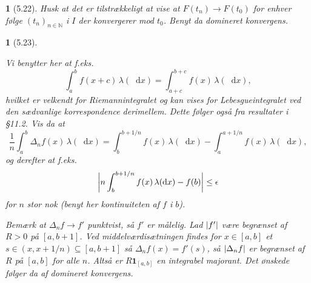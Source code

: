 \documentclass[a4paper, 11pt, article, danish, oneside]{memoir}
\title{\doctitle}
\author{\docauthor}
\newcommand{\naturals}{\mathbb{N}}
\newcommand{\blank}{\mathrel{\;\cdot\;}}
\newcommand{\blankifempty}[1]{\ifstrempty{#1}{\blank}{#1}}
\DeclarePairedDelimiter{\auxdelimlvert}{\lvert}{\rvert}
\newcommand{\abs}[2][]{\auxdelimlvert[#1]{\blankifempty{#2}}}
\newcommand{\dif}{\mathop{}\!\mathrm{d}}
\newcommand{\indicator}[1]{\mathbf{1}_{#1}}
\newcommand{\pencilsymbol}{\raisebox{-2pt}{\normalfont\PencilLeft}}
\theoremstyle{changedotcustomnumber}
\newtheorem{opgave}{\pencilsymbol}
\theoremstyle{changedotbreakcustomnumber}
\newtheorem{opgavebreak}{\pencilsymbol}
\begin{document}
\maketitle


\begin{opgave}[5.22]
    Husk at det er tilstrækkeligt at vise at $F(t_n) \to F(t_0)$ for enhver følge $(t_n)_{n \in \naturals}$ i $I$ der konvergerer mod $t_0$. Benyt da domineret konvergens.
\end{opgave}


\begin{opgavebreak}[5.23]
\begin{solutionsec}
    \item Vi benytter her at f.eks.
    \begin{equation*}
        \int_a^b f(x+c) \,\lambda(\dif x)
            = \int_{a+c}^{b+c} f(x) \,\lambda(\dif x),
    \end{equation*}
    hvilket er velkendt for Riemannintegralet og kan vises for Lebesgueintegralet ved den sædvanlige korrespondence derimellem. Dette følger også fra resultater i §11.2. Vis da at
    \begin{equation*}
        \frac{1}{n} \int_a^b \Delta_n f(x) \,\lambda(\dif x)
            = \int_b^{b+1/n} f(x) \,\lambda(\dif x) - \int_a^{a+1/n} f(x) \,\lambda(\dif x),
    \end{equation*}
    og derefter at f.eks.
    \begin{equation*}
        \abs[\bigg]{ n \int_b^{b+1/n} f(x) \,\lambda(\dif x) - f(b) }
            \leq \epsilon
    \end{equation*}
    for $n$ stor nok (benyt her kontinuiteten af $f$ i $b$).

    \item Bemærk at $\Delta_n f \to f'$ punktvist, så $f'$ er målelig. Lad $\abs{f'}$ være begrænset af $R > 0$ på $[a,b+1]$. Ved middelværdisætningen findes for $x \in [a,b]$ et $s \in (x,x+1/n) \subseteq [a,b+1]$ så $\Delta_n f(x) = f'(s)$, så $\abs{\Delta_n f}$ er begrænset af $R$ på $[a,b]$ for alle $n$. Altså er $R\indicator{[a,b]}$ en integrabel majorant. Det ønskede følger da af domineret konvergens.
\end{solutionsec}
\end{opgavebreak}
\end{document}
